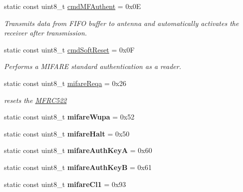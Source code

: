 \begin{DoxyCompactItemize}
static const uint8\+\_\+t \hyperlink{classMFRC522_afae620bc8a05c0dc01b87673ac2b2f02}{cmd\+M\+F\+Authent} = 0x0E
\begin{DoxyCompactList}\small\item\em Transmits data from F\+I\+FO buffer to antenna and automatically activates the receiver after transmission. \end{DoxyCompactList}\item 
\mbox{\label{classMFRC522_ac17ff69d49cd5965d8f91bf8df93c39a}} 
static const uint8\+\_\+t \hyperlink{classMFRC522_ac17ff69d49cd5965d8f91bf8df93c39a}{cmd\+Soft\+Reset} = 0x0F
\begin{DoxyCompactList}\small\item\em Performs a M\+I\+F\+A\+RE standard authentication as a reader. \end{DoxyCompactList}\item 
static const uint8\+\_\+t \hyperlink{classMFRC522_a8e438d50133c5a2a106e9bdbdeeb19ec}{mifare\+Reqa} = 0x26
\begin{DoxyCompactList}\small\item\em resets the \hyperlink{classMFRC522}{M\+F\+R\+C522} \end{DoxyCompactList}\item 
\mbox{\label{classMFRC522_a14b20b90165d697b464cc8fbcabdd472}} 
static const uint8\+\_\+t {\bfseries mifare\+Wupa} = 0x52
\item 
\mbox{\label{classMFRC522_af5419000d91fe4b40d7d7539c0221ac4}} 
static const uint8\+\_\+t {\bfseries mifare\+Halt} = 0x50
\item 
\mbox{\label{classMFRC522_a54e44da7a00e2c1ef5bd51d1e00200f0}} 
static const uint8\+\_\+t {\bfseries mifare\+Auth\+KeyA} = 0x60
\item 
\mbox{\label{classMFRC522_a23d0083f34efe15fd2c91137cad39cbc}} 
static const uint8\+\_\+t {\bfseries mifare\+Auth\+KeyB} = 0x61
\item 
\mbox{\label{classMFRC522_af75c37517407aafc7dca828c40bf76bd}} 
static const uint8\+\_\+t {\bfseries mifare\+Cl1} = 0x93
\item 
\mbox{\label{classMFRC522_ab42d4cb6434ffbdb49e06beed6d3607a}} 

\end{DoxyCompactItemize}

